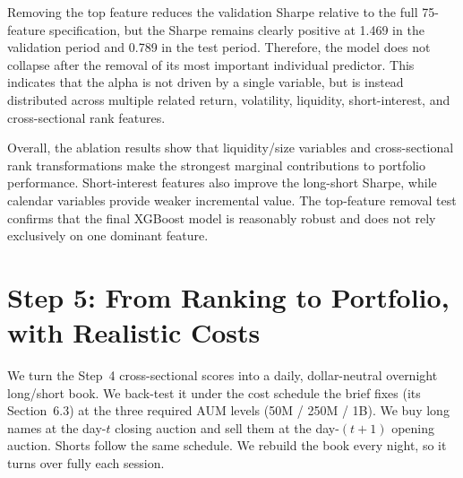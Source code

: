 \documentclass[12pt]{article}
\begin{document}
\begin{table}[htbp]
\centering
\caption{Top-feature removal robustness test}
\label{tab:top_feature_removal}
\end{table}

Removing the top feature reduces the validation Sharpe relative to the full 75-feature specification, but the Sharpe remains clearly positive at 1.469 in the validation period and 0.789 in the test period. Therefore, the model does not collapse after the removal of its most important individual predictor. This indicates that the alpha is not driven by a single variable, but is instead distributed across multiple related return, volatility, liquidity, short-interest, and cross-sectional rank features.

Overall, the ablation results show that liquidity/size variables and cross-sectional rank transformations make the strongest marginal contributions to portfolio performance. Short-interest features also improve the long-short Sharpe, while calendar variables provide weaker incremental value. The top-feature removal test confirms that the final XGBoost model is reasonably robust and does not rely exclusively on one dominant feature.

\section{Step 5: From Ranking to Portfolio, with Realistic Costs}

We turn the Step~4 cross-sectional scores into a daily, dollar-neutral overnight long/short book. We back-test it under the cost schedule the brief fixes (its Section~6.3) at the three required AUM levels (50M / 250M / 1B). We buy long names at the day-$t$ closing auction and sell them at the day-$(t{+}1)$ opening auction. Shorts follow the same schedule. We rebuild the book every night, so it turns over fully each session.
\end{document}
